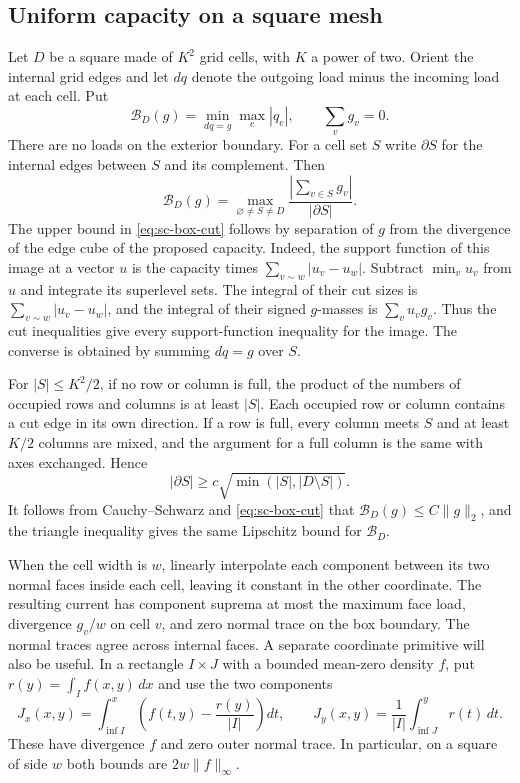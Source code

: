 \documentclass[11pt]{article}
\newcommand{\1}{\mathbf{1}}
\numberwithin{equation}{section}
\begin{document}
\subsection{Uniform capacity on a square mesh}

Let \(D\) be a square made of \(K^2\) grid cells, with \(K\) a
power of two. Orient the internal grid edges and let \(d q\)
denote the outgoing load minus the incoming load at each cell.
Put
\[
 \mathcal B_D(g)=\min_{dq=g}\max_e|q_e|,\qquad \sum_vg_v=0 .
\]
There are no loads on the exterior boundary. For a cell set \(S\)
write \(\partial S\) for the internal edges between \(S\) and its
complement. Then
\begin{equation}
 \mathcal B_D(g)=
  \max_{\varnothing\ne S\ne D}\frac{|\sum_{v\in S}g_v|}{|\partial S|}.
 \label{eq:sc-box-cut}
\end{equation}
The upper bound in \eqref{eq:sc-box-cut} follows by separation of \(g\)
from the divergence of the edge cube of the proposed capacity.
Indeed, the support function of this image at a vector \(u\) is
the capacity times \(\sum_{v\sim w}|u_v-u_w|\). Subtract \(\min_v u_v\)
from \(u\) and integrate its superlevel sets. The integral of their
cut sizes is \(\sum_{v\sim w}|u_v-u_w|\), and the integral of their
signed \(g\)-masses is \(\sum_vu_vg_v\). Thus the cut inequalities
give every support-function inequality for the image. The converse
is obtained by summing \(dq=g\) over \(S\).

For \(|S|\le K^2/2\), if no row or column is full, the product of
the numbers of occupied rows and columns is at least \(|S|\).
Each occupied row or column contains a cut edge in its own
direction. If a row is full, every column meets \(S\) and at
least \(K/2\) columns are mixed, and the argument for a full
column is the same with axes exchanged. Hence
\[
 |\partial S|\ge c\sqrt{\min(|S|,|D\setminus S|)} .
\]
It follows from Cauchy--Schwarz and \eqref{eq:sc-box-cut} that
\(\mathcal B_D(g)\le C\|g\|_2\), and the triangle inequality gives
the same Lipschitz bound for \(\mathcal B_D\).

When the cell width is \(w\), linearly interpolate each component
between its two normal faces inside each cell, leaving it
constant in the other coordinate. The resulting current has
component suprema at most the maximum face load, divergence
\(g_v/w\) on cell \(v\), and zero normal trace on the box boundary.
The normal traces agree across internal faces. A separate
coordinate primitive will also be useful. In a rectangle
\(I\times J\) with a bounded mean-zero density \(f\), put
\(r(y)=\int_I f(x,y)\,dx\) and use the two components
\begin{equation}
 J_x(x,y)=\int_{\inf I}^x\left(f(t,y)-\frac{r(y)}{|I|}\right)dt,
 \qquad
 J_y(x,y)=\frac{1}{|I|}\int_{\inf J}^y r(t)\,dt .
 \label{eq:sc-row-primitive}
\end{equation}
These have divergence \(f\) and zero outer normal trace. In
particular, on a square of side \(w\) both bounds are
\(2w\|f\|_\infty\).
\end{document}
